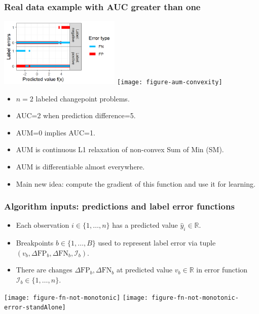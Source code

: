 \documentclass[t]{beamer}
\begin{document}
\begin{frame}
  \frametitle{Real data example with AUC greater than one}

  \includegraphics[height=1.3in]{figure-aum-convexity-profiles}
  \texttt{[image: figure-aum-convexity]}

  \begin{itemize}
  \item $n=2$ labeled changepoint problems.
  \item AUC=2 when prediction difference=5.
  \item AUM=0 implies AUC=1. 
  \item AUM is continuous L1 relaxation of non-convex Sum of Min (SM).
  \item AUM is differentiable almost everywhere.
  \item Main new idea: compute the gradient of this function and use
    it for learning.
  \end{itemize}

\end{frame}

\begin{frame}
  \frametitle{Algorithm inputs: predictions and label error functions}

  \begin{itemize}
  \item Each observation $i\in\{1,\dots,n\}$ has a predicted value
    $\hat y_i\in\mathbb R$.
  \item Breakpoints
  $b\in\{1,\dots, B\}$ used to represent label error via tuple
  $(v_b, \Delta\text{FP}_b, \Delta\text{FN}_b, \mathcal I_b)$.
\item There are changes $\Delta\text{FP}_b, \Delta\text{FN}_b$ at
  predicted value $v_b\in\mathbb R$ in error function
  $\mathcal I_b\in\{1,\dots,n\}$.
  \end{itemize}

  \texttt{[image: figure-fn-not-monotonic]}
  \texttt{[image: figure-fn-not-monotonic-error-standAlone]}

\end{frame}
\end{document}
